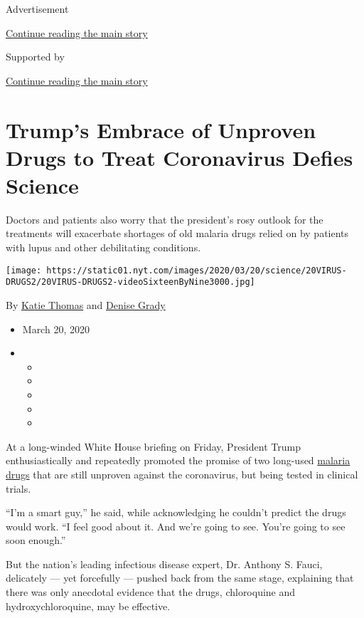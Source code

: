 Advertisement

\protect\hyperlink{after-top}{Continue reading the main story}

Supported by

\protect\hyperlink{after-sponsor}{Continue reading the main story}

\hypertarget{trumps-embrace-of-unproven-drugs-to-treat-coronavirus-defies-science}{%
\section{Trump's Embrace of Unproven Drugs to Treat Coronavirus Defies
Science}\label{trumps-embrace-of-unproven-drugs-to-treat-coronavirus-defies-science}}

Doctors and patients also worry that the president's rosy outlook for
the treatments will exacerbate shortages of old malaria drugs relied on
by patients with lupus and other debilitating conditions.

\texttt{[image: https://static01.nyt.com/images/2020/03/20/science/20VIRUS-DRUGS2/20VIRUS-DRUGS2-videoSixteenByNine3000.jpg]}

By \href{https://www.nytimes.com/by/katie-thomas}{Katie Thomas} and
\href{https://www.nytimes.com/by/denise-grady}{Denise Grady}

\begin{itemize}
\item
  March 20, 2020
\item
  \begin{itemize}
  \item
  \item
  \item
  \item
  \item
  \end{itemize}
\end{itemize}

At a long-winded White House briefing on Friday, President Trump
enthusiastically and repeatedly promoted the promise of two long-used
\href{https://www.nytimes.com/2020/04/01/health/hydroxychloroquine-coronavirus-malaria.html}{malaria
drugs} that are still unproven against the coronavirus, but being tested
in clinical trials.

``I'm a smart guy,'' he said, while acknowledging he couldn't predict
the drugs would work. ``I feel good about it. And we're going to see.
You're going to see soon enough.''

But the nation's leading infectious disease expert, Dr. Anthony S.
Fauci, delicately --- yet forcefully --- pushed back from the same
stage, explaining that there was only anecdotal evidence that the drugs,
chloroquine and hydroxychloroquine, may be effective.

